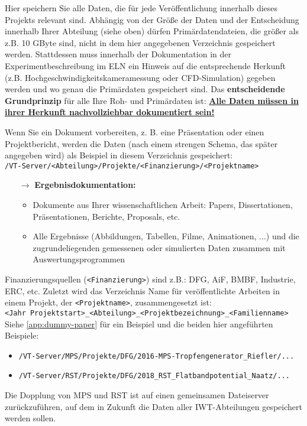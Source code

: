 Hier speichern Sie alle Daten, die für jede Veröffentlichung innerhalb dieses
Projekts relevant sind. Abhängig von der Größe der Daten und der Entscheidung
innerhalb Ihrer Abteilung (siehe oben) dürfen Primärdatendateien, die größer als
z.B. 10 GByte sind, nicht in dem hier angegebenen Verzeichnis gespeichert
werden. Stattdessen muss innerhalb der Dokumentation in der
Experimentbeschreibung im ELN ein Hinweis auf die entsprechende Herkunft (z.B.
Hochgeschwindigkeitskameramessung oder CFD-Simulation) gegeben werden und wo
genau die Primärdaten gespeichert sind. Das \textbf{entscheidende Grundprinzip}
für alle Ihre Roh- und Primärdaten ist: \textbf{\underline{Alle Daten müssen in
ihrer Herkunft nachvollziehbar dokumentiert sein!}}

Wenn Sie ein Dokument vorbereiten, z. B. eine Präsentation oder einen
Projektbericht, werden die Daten (nach einem strengen Schema, das später
angegeben wird) als Beispiel in diesem Verzeichnis gespeichert: \\
\texttt{/VT-Server/<Abteilung>/Projekte/<Finanzierung>/<Projektname>}
\begin{itemize}
  \item[$\rightarrow$] \textbf{Ergebnisdokumentation:}
    \begin{itemize}
      \item Dokumente aus Ihrer wissenschaftlichen Arbeit: Papers,
            Dissertationen, Präsentationen, Berichte, Proposals, etc.
      \item Alle Ergebnisse (Abbildungen, Tabellen, Filme, Animationen, ...)
            und die zugrundeliegenden gemessenen oder simulierten Daten
            zusammen mit Auswertungsprogrammen
    \end{itemize}
\end{itemize}
Finanzierungsquellen (\texttt{<Finanzierung>}) sind z.B.: DFG, AiF, BMBF,
Industrie, ERC, etc. Zuletzt wird das Verzeichnis Name für veröffentlichte
Arbeiten in einem Projekt, der \texttt{<Projektname>}, zusammengesetzt ist: \\
\texttt{<Jahr Projektstart>\_<Abteilung>\_<Projektbezeichnung>\_<Familienname> }
Siehe \autoref{app:dummy-paper} für ein Beispiel und die beiden hier angeführten
Beispiele:
\begin{itemize}
  \item \texttt{/VT-Server/MPS/Projekte/DFG/2016-MPS-Tropfengenerator\_Riefler/...}
  \item \texttt{/VT-Server/RST/Projekte/DFG/2018\_RST\_Flatbandpotential\_Naatz/...}
\end{itemize}
Die Dopplung von MPS und RST ist auf einen gemeinsamen Dateiserver
zurückzuführen, auf dem in Zukunft die Daten aller IWT-Abteilungen
gespeichert werden sollen.

